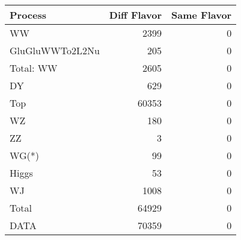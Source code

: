 \begin{table}[ht]
	\centering
\begin{tabular}{lrr}

         Process &  Diff Flavor &  Same Flavor \\
		\hline
              WW &         2399 &            0 \\
 GluGluWWTo2L2Nu &          205 &            0 \\
\hline
       Total: WW &         2605 &            0 \\
              DY &          629 &            0 \\
             Top &        60353 &            0 \\
              WZ &          180 &            0 \\
              ZZ &            3 &            0 \\
           WG(*) &           99 &            0 \\
           Higgs &           53 &            0 \\
              WJ &         1008 &            0 \\
\hline
           Total &        64929 &            0 \\
            DATA &        70359 &            0 \\


\end{tabular}

\end{table}